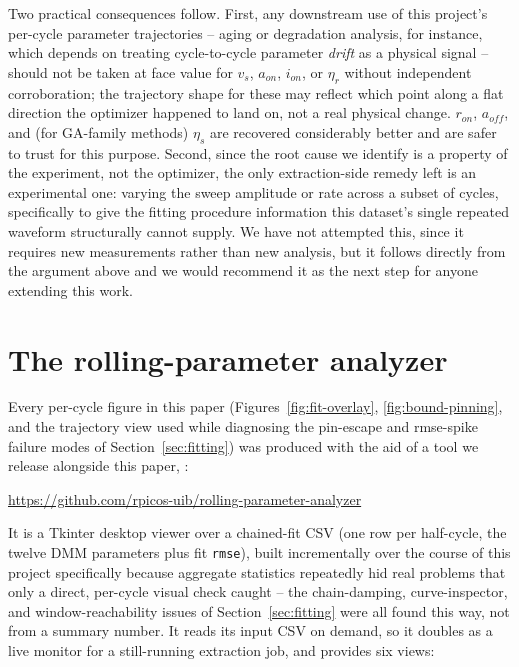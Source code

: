 \documentclass[11pt]{article}
\begin{document}
Two practical consequences follow. First, any downstream use of this
project's per-cycle parameter trajectories -- aging or degradation
analysis, for instance, which depends on treating cycle-to-cycle parameter
\emph{drift} as a physical signal -- should not be taken at face value for
$v_s$, $a_{on}$, $i_{on}$, or $\eta_r$ without independent corroboration;
the trajectory shape for these may reflect which point along a flat
direction the optimizer happened to land on, not a real physical change.
$r_{on}$, $a_{off}$, and (for GA-family methods) $\eta_s$ are recovered
considerably better and are safer to trust for this purpose. Second, since
the root cause we identify is a property of the experiment, not the
optimizer, the only extraction-side remedy left is an experimental one:
varying the sweep amplitude or rate across a subset of cycles, specifically
to give the fitting procedure information this dataset's single repeated
waveform structurally cannot supply. We have not attempted this, since it
requires new measurements rather than new analysis, but it follows directly
from the argument above and we would recommend it as the next step for
anyone extending this work.

\appendix
\section{The rolling-parameter analyzer}
\label{app:tool}

Every per-cycle figure in this paper (Figures~\ref{fig:fit-overlay},
\ref{fig:bound-pinning}, and the trajectory view used while diagnosing the
pin-escape and rmse-spike failure modes of Section~\ref{sec:fitting}) was
produced with the aid of a tool we release alongside this paper,
\cite{rollinganalyzer}:

\begin{center}
\url{https://github.com/rpicos-uib/rolling-parameter-analyzer}
\end{center}

It is a Tkinter desktop viewer over a chained-fit CSV (one row per
half-cycle, the twelve DMM parameters plus fit \texttt{rmse}), built
incrementally over the course of this project specifically because
aggregate statistics repeatedly hid real problems that only a direct,
per-cycle visual check caught -- the chain-damping, curve-inspector, and
window-reachability issues of Section~\ref{sec:fitting} were all found
this way, not from a summary number. It reads its input CSV on demand, so
it doubles as a live monitor for a still-running extraction job, and
provides six views:
\end{document}
